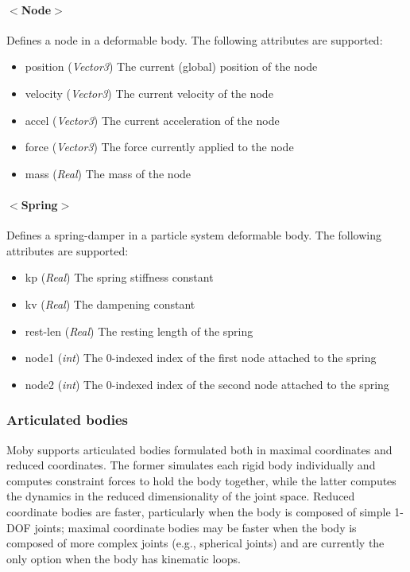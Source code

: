 \documentclass{article}
\begin{document}
\begin{landscape}
\begin{itemize}
\paragraph{$<$\textbf{Node}$>$}
Defines a node in a deformable body.  The following attributes are supported:
\begin{itemize}
\item position  (\emph{Vector3})  The current (global) position of the node
\item velocity (\emph{Vector3})  The current velocity of the node
\item accel  (\emph{Vector3})  The current acceleration of the node
\item force  (\emph{Vector3})  The force currently applied to the node
\item mass  (\emph{Real})  The mass of the node
\end{itemize}

\paragraph{$<$\textbf{Spring}$>$}
Defines a spring-damper in a particle system deformable body.  The following
attributes are supported:
\begin{itemize}
\item kp  (\emph{Real}) The spring stiffness constant 
\item kv  (\emph{Real}) The dampening constant
\item rest-len  (\emph{Real})  The resting length of the spring
\item node1  (\emph{int}) The 0-indexed index of the first node attached to the spring
\item node2  (\emph{int}) The 0-indexed index of the second node attached to the spring 
\end{itemize} %
\end{itemize} %

\subsubsection{Articulated bodies}
Moby supports articulated bodies formulated both in maximal coordinates and reduced coordinates.  The former simulates each rigid body individually and computes constraint forces to hold the body together, while the latter computes the dynamics in the reduced dimensionality of the joint space.  Reduced coordinate bodies are faster, particularly when the body is composed of simple 1-DOF joints; maximal coordinate bodies may be faster when the body is composed of more complex joints (e.g., spherical joints) and are currently the only option when the body has kinematic loops.  



\end{landscape}
\end{document}
